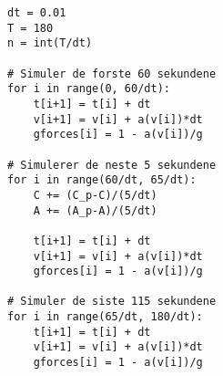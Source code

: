 \documentclass[a4paper, 11pt, notitlepage, english]{article}
\begin{document}
\begin{lstlisting}
dt = 0.01
T = 180
n = int(T/dt)

# Simuler de forste 60 sekundene
for i in range(0, 60/dt):
    t[i+1] = t[i] + dt
    v[i+1] = v[i] + a(v[i])*dt
    gforces[i] = 1 - a(v[i])/g

# Simulerer de neste 5 sekundene
for i in range(60/dt, 65/dt):
    C += (C_p-C)/(5/dt)
    A += (A_p-A)/(5/dt)

    t[i+1] = t[i] + dt
    v[i+1] = v[i] + a(v[i])*dt
    gforces[i] = 1 - a(v[i])/g

# Simuler de siste 115 sekundene
for i in range(65/dt, 180/dt):
    t[i+1] = t[i] + dt
    v[i+1] = v[i] + a(v[i])*dt
    gforces[i] = 1 - a(v[i])/g
\end{lstlisting}
\end{document}
